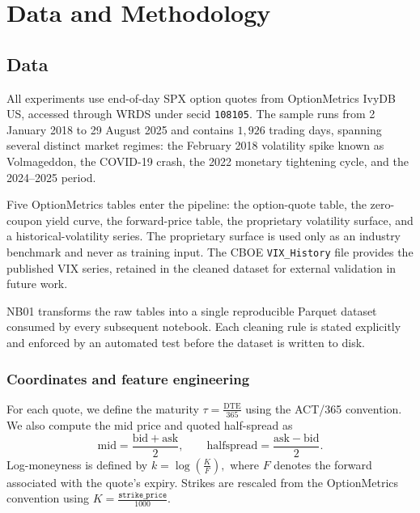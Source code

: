 \chapter{Data and Methodology}\label{ch:data}

\section{Data}\label{sec:data}

All experiments use end-of-day SPX option quotes from OptionMetrics IvyDB US, accessed through
WRDS under secid \texttt{108105}. The sample runs from 2 January 2018 to 29 August 2025 and
contains $1{,}926$ trading days, spanning several distinct market regimes: the February 2018
volatility spike known as Volmageddon, the COVID-19 crash, the 2022 monetary tightening cycle,
and the 2024--2025 period.

Five OptionMetrics tables enter the pipeline: the option-quote table, the zero-coupon yield
curve, the forward-price table, the proprietary volatility surface, and a historical-volatility
series. The proprietary surface is used only as an industry benchmark and never as training
input. The CBOE \texttt{VIX\_History} file provides the published VIX series, retained in the
cleaned dataset for external validation in future work.

NB01 transforms the raw tables into a single reproducible Parquet dataset consumed by every
subsequent notebook. Each cleaning rule is stated explicitly and enforced by an automated test
before the dataset is written to disk.

\subsection{Coordinates and feature engineering}\label{sec:coords}

For each quote, we define the maturity $\tau=\frac{\mathrm{DTE}}{365}$ using the ACT/365 convention. We also compute the mid price and quoted half-spread as
\[
\mathrm{mid}=\frac{\mathrm{bid}+\mathrm{ask}}{2},
\qquad
\mathrm{halfspread}=\frac{\mathrm{ask}-\mathrm{bid}}{2}.
\]
Log-moneyness is defined by $k=\log\!\left(\frac{K}{F}\right),$
where $F$ denotes the forward associated with the quote's expiry. Strikes are rescaled from the OptionMetrics convention using $K=\frac{\texttt{strike\_price}}{1000}.$


